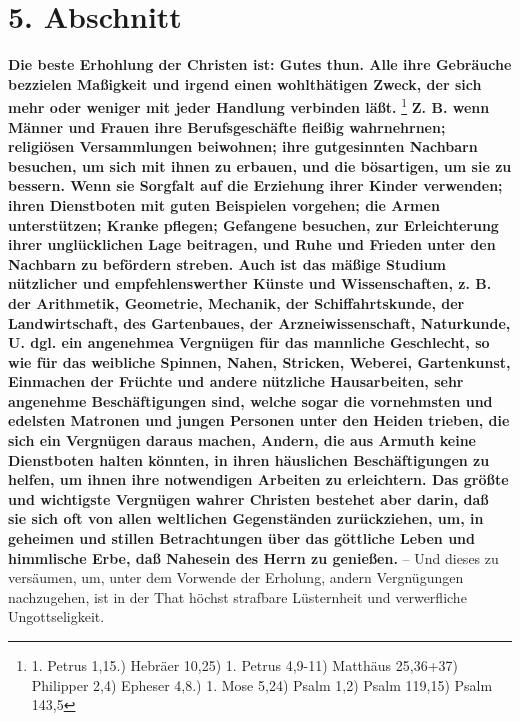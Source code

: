 \section{5. Abschnitt} \label{kap15_ab5}

\textbf{Die beste Erhohlung der Christen ist: Gutes thun. Alle ihre Gebräuche bezzielen
Maßigkeit und irgend einen wohlthätigen Zweck, der sich mehr oder weniger mit
jeder Handlung verbinden läßt.}
\footnote{1. Petrus 1,15.) Hebräer 10,25) 1. Petrus 4,9-11)
Matthäus 25,36+37) Philipper 2,4) Epheser 4,8.) 1. Mose 5,24) Psalm 1,2) Psalm 119,15) Psalm 143,5}
\textbf{Z. B. wenn Männer und Frauen ihre Berufsgeschäfte fleißig wahrnehrnen;
religiösen Versammlungen beiwohnen; ihre gutgesinnten Nachbarn besuchen, um sich
mit ihnen zu erbauen, und die bösartigen, um sie zu bessern. Wenn sie Sorgfalt
auf die Erziehung ihrer Kinder verwenden; ihren Dienstboten mit guten Beispielen
vorgehen; die Armen unterstützen; Kranke pflegen; Gefangene besuchen, zur
Erleichterung ihrer unglücklichen Lage beitragen, und Ruhe und Frieden unter den
Nachbarn zu befördern streben. Auch ist das mäßige Studium nützlicher und
empfehlenswerther Künste und Wissenschaften, z. B. der Arithmetik, Geometrie,
Mechanik, der Schiffahrtskunde, der Landwirtschaft, des Gartenbaues, der
Arzneiwissenschaft, Naturkunde, U. dgl. ein angenehmea Vergnügen für das
mannliche Geschlecht, so wie für das weibliche Spinnen, Nahen, Stricken,
Weberei, Gartenkunst, Einmachen der Früchte und andere nützliche Hausarbeiten,
sehr angenehme Beschäftigungen sind, welche sogar die vornehmsten und edelsten
Matronen und jungen Personen unter den Heiden trieben, die sich ein Vergnügen
daraus machen, Andern, die aus Armuth keine Dienstboten halten könnten, in ihren
häuslichen Beschäftigungen zu helfen, um ihnen ihre notwendigen Arbeiten zu
erleichtern. Das größte und wichtigste Vergnügen wahrer Christen bestehet aber
darin, daß sie sich oft von allen weltlichen Gegenständen zurückziehen, um, in
geheimen und stillen Betrachtungen über das göttliche Leben und himmlische Erbe,
daß Nahesein des Herrn zu genießen.} -- Und dieses zu versäumen, um, unter dem
Vorwende der Erholung, andern Vergnügungen nachzugehen, ist in der That höchst
strafbare Lüsternheit und verwerfliche Ungottseligkeit.

